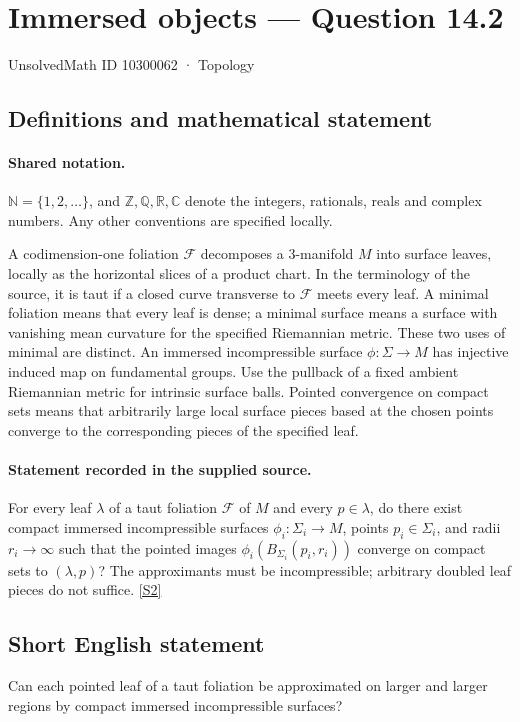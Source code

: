 \documentclass[11pt]{article}
\newcommand{\sref}[2]{\hyperlink{source:#1:#2}{[S#2]}}
\begin{document}
\setcounter{section}{10300061}
\section{Immersed objects — Question 14.2}\label{10300062}
{\small\sffamily UnsolvedMath ID 10300062 · Topology}
\subsection{Definitions and mathematical statement}

\paragraph{Shared notation.}$\mathbb N=\{1,2,\ldots\}$, and $\mathbb Z,\mathbb Q,\mathbb R,\mathbb C$ denote the integers, rationals, reals and complex numbers. Any other conventions are specified locally.


A codimension-one foliation $\mathcal F$ decomposes a $3$-manifold $M$ into surface leaves, locally as the horizontal slices of a product chart. In the terminology of the source, it is taut if a closed curve transverse to $\mathcal F$ meets every leaf. A minimal foliation means that every leaf is dense; a minimal surface means a surface with vanishing mean curvature for the specified Riemannian metric. These two uses of minimal are distinct. An immersed incompressible surface $\phi:\Sigma\to M$ has injective induced map on fundamental groups. Use the pullback of a fixed ambient Riemannian metric for intrinsic surface balls. Pointed convergence on compact sets means that arbitrarily large local surface pieces based at the chosen points converge to the corresponding pieces of the specified leaf.
\paragraph{Statement recorded in the supplied source.}
For every leaf $\lambda$ of a taut foliation $\mathcal F$ of $M$ and every $p\in\lambda$, do there exist compact immersed incompressible surfaces $\phi_i:\Sigma_i\to M$, points $p_i\in\Sigma_i$, and radii $r_i\to\infty$ such that the pointed images $\phi_i(B_{\Sigma_i}(p_i,r_i))$ converge on compact sets to $(\lambda,p)$? The approximants must be incompressible; arbitrary doubled leaf pieces do not suffice. \sref{10300062}{2}
\subsection{Short English statement}
Can each pointed leaf of a taut foliation be approximated on larger and larger regions by compact immersed incompressible surfaces?
\end{document}
